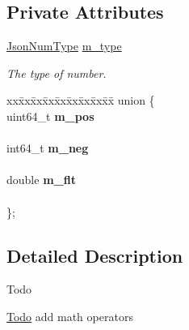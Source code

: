\subsection*{Private Attributes}
\begin{DoxyCompactItemize}
\item 
\mbox{\label{classnta_1_1utils_1_1JsonNum_abd54e505bcd33dc45877c4b4bb92fa4e}} 
\hyperlink{namespacenta_1_1utils_a83ee7c4cfccd9fa43564f5fe1c0c77d3}{Json\+Num\+Type} \hyperlink{classnta_1_1utils_1_1JsonNum_abd54e505bcd33dc45877c4b4bb92fa4e}{m\+\_\+type}
\begin{DoxyCompactList}\small\item\em The type of number. \end{DoxyCompactList}\item 
\mbox{\label{classnta_1_1utils_1_1JsonNum_a8f60aff135bd41d1680ecdaa738a4a02}} 
\begin{tabbing}
xx\=xx\=xx\=xx\=xx\=xx\=xx\=xx\=xx\=\kill
union \{\\
\mbox{\label{classnta_1_1utils_1_1JsonNum_a266052a158fca895978bb7d9ec43f6ff}} 
uint64\_t {\bfseries m\_pos}\\
\>\\
\mbox{\label{classnta_1_1utils_1_1JsonNum_af488d5d931bc8979df8671070365ac2b}} 
int64\_t {\bfseries m\_neg}\\
\>\\
\mbox{\label{classnta_1_1utils_1_1JsonNum_a01cf51bb14293115a5b3f140ade23d4d}} 
double {\bfseries m\_flt}\\
\>\\
\}; \\

\end{tabbing}\end{DoxyCompactItemize}


\subsection{Detailed Description}
\begin{DoxyRefDesc}{Todo}
\item[\hyperlink{todo__todo000005}{Todo}]add math operators\end{DoxyRefDesc}


